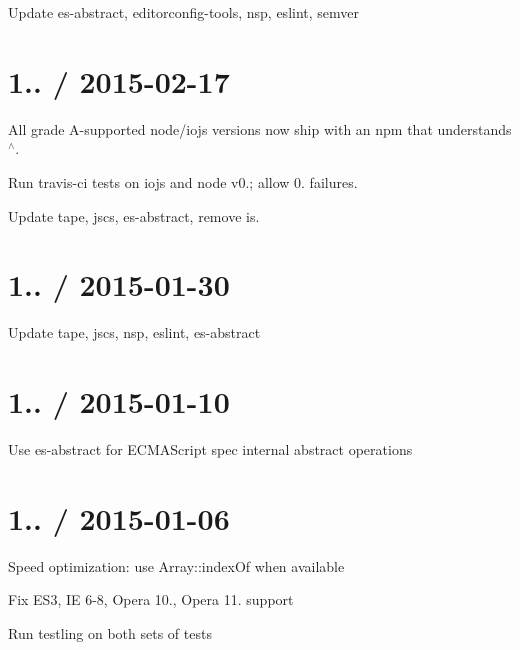 \begin{DoxyItemize}
\item Update {\ttfamily es-\/abstract}, {\ttfamily editorconfig-\/tools}, {\ttfamily nsp}, {\ttfamily eslint}, {\ttfamily semver}
\end{DoxyItemize}

\section*{1.. / 2015-\/02-\/17 }


\begin{DoxyItemize}
\item All grade A-\/supported {\ttfamily node}/{\ttfamily iojs} versions now ship with an {\ttfamily npm} that understands {\ttfamily $^\wedge$}.
\item Run {\ttfamily travis-\/ci} tests on {\ttfamily iojs} and {\ttfamily node} v0.; allow 0. failures.
\item Update {\ttfamily tape}, {\ttfamily jscs}, {\ttfamily es-\/abstract}, remove {\ttfamily is}.
\end{DoxyItemize}

\section*{1.. / 2015-\/01-\/30 }


\begin{DoxyItemize}
\item Update {\ttfamily tape}, {\ttfamily jscs}, {\ttfamily nsp}, {\ttfamily eslint}, {\ttfamily es-\/abstract}
\end{DoxyItemize}

\section*{1.. / 2015-\/01-\/10 }


\begin{DoxyItemize}
\item Use {\ttfamily es-\/abstract} for E\+C\+M\+A\+Script spec internal abstract operations
\end{DoxyItemize}

\section*{1.. / 2015-\/01-\/06 }


\begin{DoxyItemize}
\item Speed optimization\+: use Array\+::index\+Of when available
\item Fix E\+S3, IE 6-\/8, Opera 10., Opera 11. support
\item Run testling on both sets of tests
\end{DoxyItemize}


